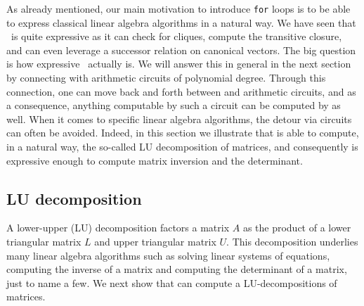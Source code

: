 As already mentioned, our main motivation to introduce \texttt{for} loops is to be able
to express classical linear algebra algorithms in a natural way. We have seen that \langfor\ is
quite expressive as it can check for cliques, compute the transitive closure, and can even
leverage a successor relation on canonical vectors. The big question is how expressive \langfor\
actually is. We will answer this in general in the next section by connecting \langfor with 
arithmetic circuits of polynomial degree. Through this connection, one can move back and forth between \langfor and arithmetic circuits, and as a consequence, anything computable by such a circuit can be
computed by \langfor as well. When it comes to specific linear algebra algorithms, the detour via circuits
can often be avoided. Indeed, in this section we illustrate that \langfor is able to
compute, in a natural way, the so-called LU decomposition of matrices, and consequently \langfor is expressive enough to compute matrix inversion and the determinant. 

\subsection{LU decomposition}
%
%
A lower-upper (LU) decomposition factors a matrix $A$ as the product of a lower triangular matrix $L$ and upper triangular matrix $U$. This decomposition  underlies many linear algebra algorithms such as solving linear systems of equations, computing the inverse of a matrix and computing the determinant of a matrix, just to name a few. We next show that \langfor can compute a LU-decompositions of matrices.

